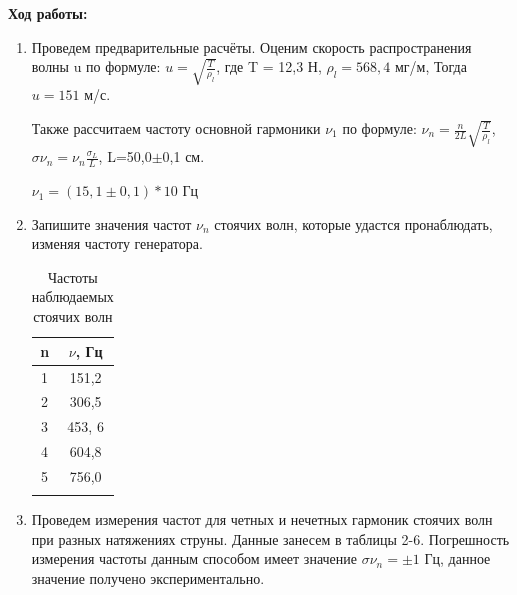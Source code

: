 \documentclass[a4paper, 12pt]{article}%
\begin{document}
    \newpage
    \textbf{Ход работы:}
    \begin{enumerate}
	\item  Проведем  предварительные расчёты. Оценим скорость распространения волны u по формуле: $u=\sqrt{\frac{T}{\rho_l}} $,  где T = 12,3 Н, $\rho_l = 568,4 $ мг/м,  Тогда $u = 151$ м/с.
	
	Также рассчитаем частоту основной гармоники $\nu_1$ по формуле: $\nu_n = \frac{n}{2L} \sqrt{\frac{T}{\rho_l}}$,\\
	 $\sigma{\nu_n}=\nu_n \frac{\sigma_L}{L}$, L=50,0$\pm$0,1 см.
	 	
	 $\nu_1 = (15,1 \pm 0,1)*10$ Гц
	 
	 
	 
	 \item Запишите значения частот $\nu_n$ стоячих волн, которые удастся пронаблюдать, изменяя частоту генератора.
	 
	 	\begin{longtable}{|c|c|}
	 		\hline 
	 		n & $\nu$, Гц \\
	 		\hline
	 		1 & 151,2 \\
	 		\hline
	 		2 & 306,5 \\
	 		\hline
	 		3 & 453, 6 \\
	 		\hline
	 		4 & 604,8 \\
	 		\hline
	 		5 & 756,0\\
	 		\hline
	 		\caption{Частоты наблюдаемых стоячих волн}
	 	\end{longtable}
 	

     \item Проведем измерения частот для четных и нечетных гармоник стоячих волн при разных натяжениях струны. Данные занесем в таблицы 2-6. Погрешность измерения частоты данным способом имеет значение $\sigma{\nu_n}=\pm 1$ Гц, данное значение получено экспериментально.
     

\end{enumerate}
\end{document}
